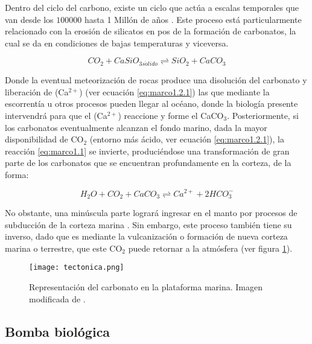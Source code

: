 Dentro del ciclo del carbono, existe un ciclo que actúa a escalas temporales que van desde los $100000$ hasta 1 Millón de años \citep{sleep2001carbon}. Este proceso está particularmente relacionado con la erosión de silicatos en pos de la formación de carbonatos, la cual se da en condiciones de bajas temperaturas y viceversa. 

\begin{equation} \label{eq:marco1.1}
CO_{2} + CaSiO_{3 s\acute{o}lido} \rightleftharpoons SiO_{2} + CaCO_{3}
\end{equation}

Donde la eventual meteorización de rocas produce una disolución del carbonato y liberación de (Ca$^{2+}$) (ver ecuación \ref{eq:marco1.2.1}) las que mediante la escorrentía u otros procesos pueden llegar al océano, donde la biolog\'ia presente intervendr\'a para que el (Ca$^{2+}$) reaccione y forme el CaCO${_3}$. Posteriormente, si los carbonatos eventualmente alcanzan el fondo marino, dada la mayor disponibilidad de CO$_2$ (entorno m\'as \'acido, ver ecuaci\'on \ref{eq:marco1.2.1}), la reacci\'on \ref{eq:marco1.1} se invierte, produci\'endose una transformaci\'on de gran parte de los carbonatos que se encuentran profundamente en la corteza, de la forma:

\begin{equation} \label{eq:marco1.2.1}
H_{2}O + CO_{2} + CaCO_{3} \rightleftharpoons Ca^{2+} + 2HCO_{3}^{-}
\end{equation}

 No obstante, una minúscula parte logrará ingresar en el manto por procesos de subducción de la corteza marina \citep{sleep2001carbon,raymo1992tectonic}. 
 Sin embargo, este proceso también tiene su inverso, dado que es mediante la vulcanización o formación de nueva corteza marina o terrestre, que este CO$_2$ puede retornar a la atmósfera (ver figura \ref{fig:marc0.1}). \\

 \begin{figure}[H]
\centering
 \texttt{[image: tectonica.png]}
 \caption[Ciclo del carbonato]{Representación del carbonato en la plataforma marina. Imagen modificada de \citep{sleep2001carbon}.}
  \label{fig:marc0.1}
\end{figure}


\subsection{Bomba biológica}

